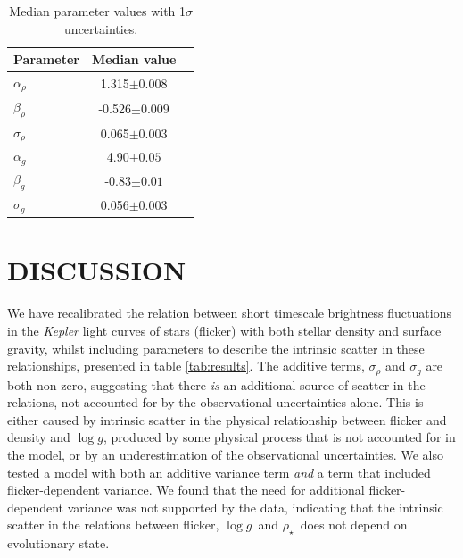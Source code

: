 \documentclass[apjl]{emulateapj}
\newcommand{\logg}{$\log g$}
\newcommand{\rhostar}{$\rho_{\star}$}
\begin{document}
\begin{table}
\begin{center}
\caption{Median parameter values with 1$\sigma$ uncertainties.}
\begin{tabular}{lcc}
\hline\hline
Parameter & Median value \\
    \hline
$\alpha_\rho$   &    1.315$\pm 0.008$   \\
$\beta_\rho$    &    -0.526$\pm 0.009$   \\
$\sigma_\rho$   &    0.065$\pm 0.003$   \\
\hline
$\alpha_g$      &    4.90$\pm 0.05$   \\
$\beta_g$       &   -0.83$\pm 0.01$   \\
$\sigma_g$      &    0.056$\pm 0.003$   \\
    \hline
\end{tabular}
\end{center}
\end{table}
\label{tab:results}

\section{DISCUSSION}
\label{sec:discussion}


We have recalibrated the relation between short timescale brightness
fluctuations in the {\it Kepler} light curves of stars (flicker) with both
stellar density and surface gravity, whilst including parameters to describe
the intrinsic scatter in these relationships, presented in table
\ref{tab:results}.
The additive terms, $\sigma_\rho$ and $ \sigma_g$ are both non-zero,
suggesting that there {\it is} an additional source of scatter in the
relations, not accounted for by the observational uncertainties alone.
This is either caused by intrinsic scatter in the physical relationship
between flicker and density and \logg, produced by some physical process that
is not accounted for in the model, or by an underestimation of the
observational uncertainties.
We also tested a model with both an additive variance term {\it and} a term
that included flicker-dependent variance.
We found that the need for additional flicker-dependent variance was not
supported by the data, indicating that the intrinsic scatter in the relations
between flicker, \logg\ and \rhostar\ does not depend on evolutionary state.
\end{document}
